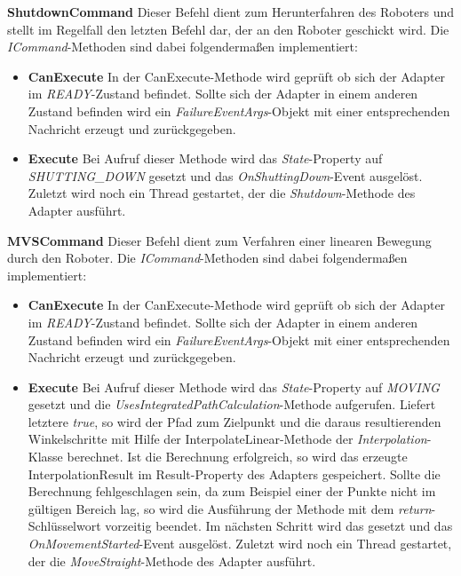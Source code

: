 \textbf{ShutdownCommand}
\newline
Dieser Befehl dient zum Herunterfahren des Roboters und stellt im Regelfall den letzten Befehl dar, der an den Roboter geschickt wird. Die \textit{ICommand}-Methoden sind dabei folgendermaßen implementiert:
\begin{itemize}
\item \textbf{CanExecute}
\newline
In der CanExecute-Methode wird geprüft ob sich der Adapter im \textit{READY}-Zustand befindet. Sollte sich der Adapter in einem anderen Zustand befinden wird ein \textit{FailureEventArgs}-Objekt mit einer entsprechenden Nachricht erzeugt und zurückgegeben.
\item \textbf{Execute}
\newline
Bei Aufruf dieser Methode wird das \textit{State}-Property auf \textit{SHUTTING\_DOWN} gesetzt und das \textit{OnShuttingDown}-Event ausgelöst. Zuletzt wird noch ein Thread gestartet, der die \textit{Shutdown}-Methode des Adapter ausführt.
\end{itemize}

\textbf{MVSCommand}
\newline
Dieser Befehl dient zum Verfahren einer linearen Bewegung durch den Roboter. Die \textit{ICommand}-Methoden sind dabei folgendermaßen implementiert:
\begin{itemize}
\item \textbf{CanExecute}
\newline
In der CanExecute-Methode wird geprüft ob sich der Adapter im \textit{READY}-Zustand befindet. Sollte sich der Adapter in einem anderen Zustand befinden wird ein \textit{FailureEventArgs}-Objekt mit einer entsprechenden Nachricht erzeugt und zurückgegeben.
\item \textbf{Execute}
\newline
Bei Aufruf dieser Methode wird das \textit{State}-Property auf \textit{MOVING} gesetzt und die \textit{UsesIntegratedPathCalculation}-Methode aufgerufen. Liefert letztere \textit{true}, so wird der Pfad zum Zielpunkt und die daraus resultierenden Winkelschritte mit Hilfe der InterpolateLinear-Methode der \textit{Interpolation}-Klasse berechnet. Ist die Berechnung erfolgreich, so wird das erzeugte InterpolationResult im Result-Property des Adapters gespeichert. Sollte die Berechnung fehlgeschlagen sein, da zum Beispiel einer der Punkte nicht im gültigen Bereich lag, so wird die Ausführung der Methode mit dem \textit{return}-Schlüsselwort vorzeitig beendet. Im nächsten Schritt wird das  gesetzt und das \textit{OnMovementStarted}-Event ausgelöst. Zuletzt wird noch ein Thread gestartet, der die \textit{MoveStraight}-Methode des Adapter ausführt.
\end{itemize}

